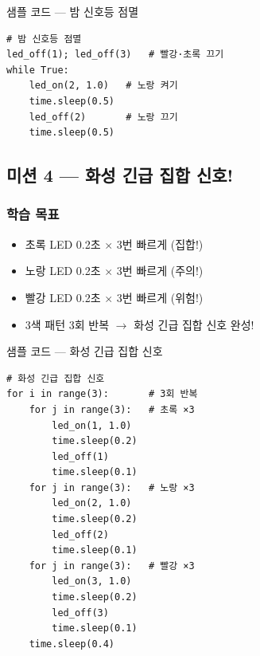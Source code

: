 \begin{labbox}{샘플 코드 --- 밤 신호등 점멸}
\begin{verbatim}
# 밤 신호등 점멸
led_off(1); led_off(3)   # 빨강·초록 끄기
while True:
    led_on(2, 1.0)   # 노랑 켜기
    time.sleep(0.5)
    led_off(2)       # 노랑 끄기
    time.sleep(0.5)
\end{verbatim}
\end{labbox}

\subsection{미션 4 --- 화성 긴급 집합 신호!}
\label{subsec:ch05-m4}

\begin{storybox}
\end{storybox}

\subsubsection*{학습 목표}
\begin{itemize}[leftmargin=1.4em]
  \item 초록 LED 0.2초 $\times$ 3번 빠르게 (집합!)
  \item 노랑 LED 0.2초 $\times$ 3번 빠르게 (주의!)
  \item 빨강 LED 0.2초 $\times$ 3번 빠르게 (위험!)
  \item 3색 패턴 3회 반복 $\rightarrow$ 화성 긴급 집합 신호 완성!
\end{itemize}

\begin{labbox}{샘플 코드 --- 화성 긴급 집합 신호}
\begin{verbatim}
# 화성 긴급 집합 신호
for i in range(3):       # 3회 반복
    for j in range(3):   # 초록 ×3
        led_on(1, 1.0)
        time.sleep(0.2)
        led_off(1)
        time.sleep(0.1)
    for j in range(3):   # 노랑 ×3
        led_on(2, 1.0)
        time.sleep(0.2)
        led_off(2)
        time.sleep(0.1)
    for j in range(3):   # 빨강 ×3
        led_on(3, 1.0)
        time.sleep(0.2)
        led_off(3)
        time.sleep(0.1)
    time.sleep(0.4)
\end{verbatim}
\end{labbox}
